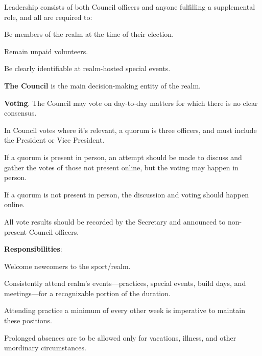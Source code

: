 \documentclass[12pt]{article}
\begin{document}
\begin{level}
    \item Leadership consists of both Council officers and anyone fulfilling a supplemental role, and all are required to:
    \begin{level}
        \item Be members of the realm at the time of their election.
        \item Remain unpaid volunteers.
        \item Be clearly identifiable at realm-hosted special events.
    \end{level}
    \item \textbf{The Council} is the main decision-making entity of the realm. 
        \begin{level}
            \item \textbf{Voting}. The Council may vote on day-to-day matters for which there is no clear consensus.
            \begin{level}
                \item In Council votes where it's relevant, a quorum is three officers, and must include the President or Vice President. 
                \item If a quorum is present in person, an attempt should be made to discuss and gather the votes of those not present online, but the voting may happen in person.
                \item If a quorum is not present in person, the discussion and voting should happen online.
                \item All vote results should be recorded by the Secretary and announced to non-present Council officers. 
            \end{level}
            \item \textbf{Responsibilities}:
            \begin{level}
                \item Welcome newcomers to the sport/realm.
                \item Consistently attend realm's events---practices, special events, build days, and meetings---for a recognizable portion of the duration. 
                \begin{level}
                    \item Attending practice a minimum of every other week is imperative to maintain these positions. 
                    \item Prolonged absences are to be allowed only for vacations, illness, and other unordinary circumstances. 

\end{level}
\end{level}
\end{level}
\end{level}
\end{document}

